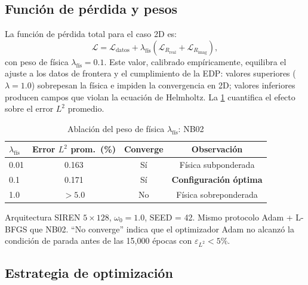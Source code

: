 \subsection{Función de pérdida y pesos}
\label{subsec:loss}

La función de pérdida total para el caso 2D es:
%
\begin{equation}
  \mathcal{L} = \mathcal{L}_{\mathrm{datos}}
              + \lambda_{\mathrm{fís}}\!\left(
                  \mathcal{L}_{R_{\mathrm{real}}} + \mathcal{L}_{R_{\mathrm{imag}}}
                \right),
  \label{eq:loss_2d}
\end{equation}
%
con peso de física $\lambda_{\mathrm{fís}} = 0.1$.
Este valor, calibrado empíricamente, equilibra el ajuste a los datos de frontera y
el cumplimiento de la EDP: valores superiores ($\lambda = 1.0$) sobrepesan la física
e impiden la convergencia en 2D; valores inferiores producen campos que violan la
ecuación de Helmholtz.
La \cref{tab:ablacion_lambda} cuantifica el efecto sobre el error $L^2$ promedio.

\begin{table}[htbp]
\centering
\begin{threeparttable}
\caption{Ablación del peso de física $\lambda_{\mathrm{fís}}$: NB02}
\label{tab:ablacion_lambda}
\begin{tabular}{lccc}
\toprule
$\lambda_{\mathrm{fís}}$ & Error $L^2$ prom.\ (\%) & Converge & Observación \\
\midrule
0.01  & 0.163 & Sí & Física subponderada \\
0.1   & 0.171 & Sí & \textbf{Configuración óptima} \\
1.0   & $>5.0$ & No & Física sobreponderada \\
\bottomrule
\end{tabular}
\begin{tablenotes}
\small
\item Arquitectura SIREN $5\times128$, $\omega_0 = 1.0$, SEED = 42.
      Mismo protocolo Adam + L-BFGS que NB02.
      ``No converge'' indica que el optimizador Adam no alcanzó la condición
      de parada antes de las 15{,}000 épocas con $\varepsilon_{L^2} < 5\%$.
\end{tablenotes}
\end{threeparttable}
\end{table}

\subsection{Estrategia de optimización}
\label{subsec:optimizacion}

